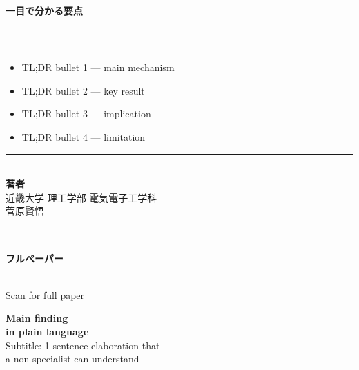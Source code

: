 \documentclass[a0paper,landscape,25pt]{bxjsarticle}
\begin{document}
\noindent
\begin{minipage}[t]{0.24\linewidth}
    \begin{tcolorbox}[
        colback=barbg, coltext=barink, boxrule=0pt,
        height=0.97\textheight, valign=top, arc=0pt,
        left=12pt,right=12pt,top=12pt,bottom=12pt
    ]
        {\fontsize{34}{40}\selectfont\bfseries 一目で分かる要点}\\[6pt]
        \rule{\linewidth}{0.5pt}\\[6pt]
        {\fontsize{28}{38}\selectfont
        \begin{itemize}[leftmargin=*, itemsep=4pt]
            \item TL;DR bullet 1 — main mechanism
            \item TL;DR bullet 2 — key result
            \item TL;DR bullet 3 — implication
            \item TL;DR bullet 4 — limitation
        \end{itemize}}

        \vspace{20pt}
        \rule{\linewidth}{0.5pt}\\[10pt]
        {\fontsize{24}{30}\selectfont\bfseries 著者}\\[4pt]
        {\fontsize{22}{28}\selectfont 近畿大学 理工学部 電気電子工学科\\菅原賢悟}

        \vspace{20pt}
        \rule{\linewidth}{0.5pt}\\[10pt]
        {\fontsize{24}{30}\selectfont\bfseries フルペーパー}\\[6pt]
        \begin{center}
        \\[4pt]
        {\fontsize{18}{22}\selectfont Scan for full paper}
        \end{center}
    \end{tcolorbox}
\end{minipage}\hfill
\begin{minipage}[t]{0.48\linewidth}
    \begin{tcolorbox}[
        colback=billboardbg, coltext=billboardink, boxrule=0pt,
        height=0.97\textheight, valign=center, arc=0pt,
        left=20pt,right=20pt,top=20pt,bottom=20pt
    ]
        \begin{center}
        {\fontsize{120}{140}\selectfont\bfseries
        \textcolor{accent}{Main finding}\\
        in plain language}\\[40pt]
        {\fontsize{50}{60}\selectfont
        Subtitle: 1 sentence elaboration that\\
        a non-specialist can understand}
        \end{center}
    \end{tcolorbox}
\end{minipage}\hfill
\end{document}
